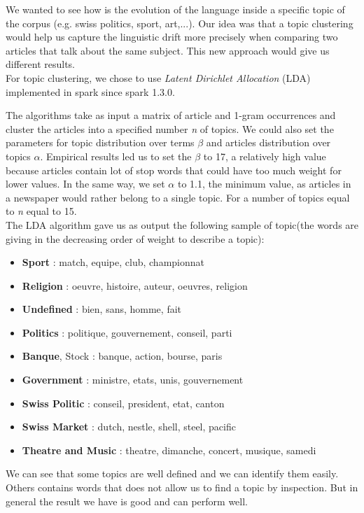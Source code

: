 We wanted to see how is the evolution of the language inside a specific topic of the corpus (e.g. swiss politics, sport, art,...).	
Our idea was that a topic clustering would help us capture the linguistic drift more precisely when comparing two articles that talk about the same subject.
This new approach would give us different results.\\
For topic clustering, we chose to use \emph{Latent Dirichlet Allocation} (LDA) implemented in spark since spark 1.3.0.

The algorithms take as input a matrix of article and 1-gram occurrences and cluster the articles into a specified number \textit{n} of topics. We could also set the parameters for topic distribution over terms $\beta$ and articles distribution over topics $\alpha$. Empirical results led us to set the $\beta$ to 17, a relatively high value because articles contain lot of stop words that could have too much weight for lower values. In the same way, we set $\alpha$ to 1.1, the minimum value, as articles in a newspaper would rather belong to a single topic. For a number of topics equal to \textit{n} equal to 15.\\
The LDA algorithm gave us as output the following sample of topic(the words are giving in the decreasing order of weight to describe a topic):

\begin{itemize}
    \item \textbf{Sport} : match, equipe, club, championnat
    \item \textbf{Religion} : oeuvre, histoire, auteur, oeuvres, religion
    \item \textbf{Undefined} : bien, sans, homme, fait
    \item \textbf{Politics} : politique, gouvernement, conseil, parti
    \item \textbf{Banque}, Stock : banque, action, bourse, paris
    \item \textbf{Government} : ministre, etats, unis, gouvernement
    \item \textbf{Swiss Politic} : conseil, president, etat, canton
    \item \textbf{Swiss Market} : dutch, nestle, shell, steel, pacific
	\item \textbf{Theatre and Music} : theatre, dimanche, concert, musique, samedi
\end{itemize}

We can see that some topics are well defined and we can identify them easily. Others contains words that does not allow us to find a topic by inspection. But in general the result we have is good and can perform well.

